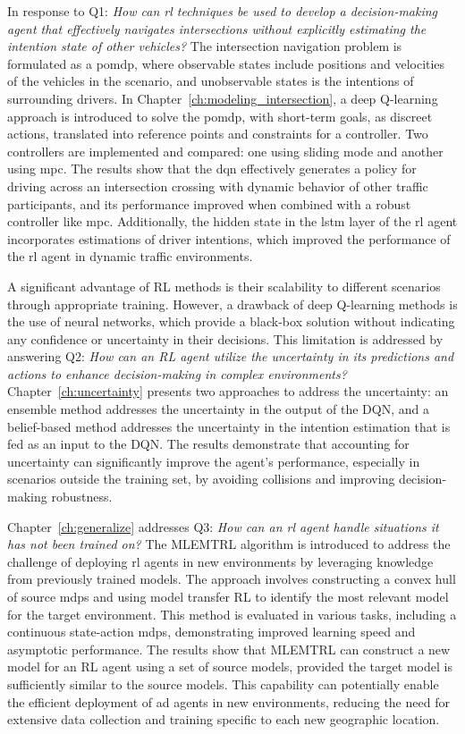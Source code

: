 In response to Q1: \textit{How can \gls{rl} techniques be used to develop a decision-making agent that effectively navigates intersections without explicitly estimating the intention state of other vehicles?} The intersection navigation problem is formulated as a \gls{pomdp}, where observable states include positions and velocities of the vehicles in the scenario, and unobservable states is the intentions of surrounding drivers. 
In Chapter~\ref{ch:modeling_intersection}, a deep Q-learning approach is introduced to solve the \gls{pomdp}, with short-term goals, as discreet actions, translated into reference points and constraints for a controller. Two controllers are implemented and compared: one using sliding mode and another using \gls{mpc}. The results show that the \gls{dqn} effectively generates a policy for driving across an intersection crossing with dynamic behavior of other traffic participants, and its performance improved when combined with a robust controller like \gls{mpc}.  
Additionally, the hidden state in the \gls{lstm} layer of the \gls{rl} agent incorporates estimations of driver intentions, which improved the performance of the \gls{rl} agent in dynamic traffic environments.

A significant advantage of RL methods is their scalability to different scenarios through appropriate training. However, a drawback of deep Q-learning methods is the use of neural networks, which provide a black-box solution without indicating any confidence or uncertainty in their decisions. 
This limitation is addressed by answering Q2: \textit{How can an RL agent utilize the uncertainty in its predictions and actions to enhance decision-making in complex environments?} 
Chapter~\ref{ch:uncertainty} presents two approaches to address the uncertainty: an ensemble method addresses the uncertainty in the output of the DQN, and a belief-based method addresses the uncertainty in the intention estimation that is fed as an input to the DQN. The results demonstrate that accounting for uncertainty can significantly improve the agent's performance, especially in scenarios outside the training set, by avoiding collisions and improving decision-making robustness.

Chapter~\ref{ch:generalize} addresses Q3: \textit{How can an \gls{rl} agent handle situations it has not been trained on?} The MLEMTRL algorithm is introduced to address the challenge of deploying \gls{rl} agents in new environments by leveraging knowledge from previously trained models. The approach involves constructing a convex hull of source \gls{mdp}s and using model transfer RL to identify the most relevant model for the target environment. This method is evaluated in various tasks, including a continuous state-action \gls{mdp}s, demonstrating improved learning speed and asymptotic performance.
The results show that MLEMTRL can construct a new model for an RL agent using a set of source models, provided the target model is sufficiently similar to the source models. This capability can potentially enable the efficient deployment of \gls{ad} agents in new environments, reducing the need for extensive data collection and training specific to each new geographic location. 

